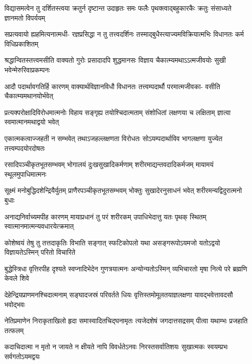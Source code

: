 \fourlineindentedshloka
{विद्यासमत्वेन तु दर्शितस्त्वया}
{क्रतुर्न दृष्टान्त उदाहृतः समः}
{फलैः पृथक्त्वाद्बहुकारकैः क्रतुः}
{संसाध्यते ज्ञानमतो विपर्ययम्} %

\fourlineindentedshloka
{सप्रत्यवायो ह्यहमित्यनात्मधी-}
{रज्ञप्रसिद्धा न तु तत्त्वदर्शिनः}
{तस्माद्बुधैस्त्याज्यमविक्रियात्मभिः}
{विधानतः कर्म विधिप्रकाशितम्} %

\fourlineindentedshloka
{श्रद्धान्वितस्तत्त्वमसीति वाक्यतो}
{गुरोः प्रसादादपि शुद्धमानसः}
{विज्ञाय चैकात्म्यमथाऽऽत्मजीवयोः}
{सुखी भवेन्मेरुरिवाप्रकम्पनः} %

\fourlineindentedshloka
{आदौ पदार्थावगतिर्हि कारणम्}
{वाक्यार्थविज्ञानविधौ विधानतः}
{तत्त्वम्पदार्थौ परमात्मजीवका-}
{वसीति चैकात्म्यमथानयोर्भवेत्} %

\fourlineindentedshloka
{प्रत्यक्परोक्षादिविरोधमात्मनोः}
{विहाय सङ्गृह्य तयोश्चिदात्मताम्}
{संशोधितां लक्षणया च लक्षिताम्}
{ज्ञात्वा स्वमात्मानमथाद्वयो भवेत्} %

\fourlineindentedshloka
{एकात्मकत्वाज्जहती न सम्भवेत्}
{तथाऽजहल्लक्षणता विरोधतः}
{सोऽयम्पदार्थाविव भागलक्षणा}
{युज्येत तत्त्वम्पदयोरदोषतः} %

\fourlineindentedshloka
{रसादिपञ्चीकृतभूतसम्भवम्}
{भोगालयं दुःखसुखादिकर्मणाम्}
{शरीरमाद्यन्तवदादिकर्मजम्}
{मायामयं स्थूलमुपाधिमात्मनः} %

\fourlineindentedshloka
{सूक्ष्मं मनोबुद्धिदशेन्द्रियैर्युतम्}
{प्राणैरपञ्चीकृतभूतसम्भवम्}
{भोक्तुः सुखादेरनुसाधनं भवेत्}
{शरीरमन्यद्विदुरात्मनो बुधाः} %

\fourlineindentedshloka
{अनाद्यनिर्वाच्यमपीह कारणम्}
{मायाप्रधानं तु परं शरीरकम्}
{उपाधिभेदात्तु यतः पृथक् स्थितम्}
{स्वात्मानमात्मन्यवधारयेत्क्रमात्} %

\fourlineindentedshloka
{कोशेष्वयं तेषु तु तत्तदाकृतिः}
{विभाति सङ्गात् स्फटिकोपलो यथा}
{असङ्गरूपोऽयमजो यतोऽद्वयो}
{विज्ञायतेऽस्मिन् परितो विचारिते} %

\fourlineindentedshloka
{बुद्धेस्त्रिधा वृत्तिरपीह दृश्यते}
{स्वप्नादिभेदेन गुणत्रयात्मनः}
{अन्योन्यतोऽस्मिन् व्यभिचारतो मृषा}
{नित्ये परे ब्रह्मणि केवले शिवे} %

\fourlineindentedshloka
{देहेन्द्रियप्राणमनश्चिदात्मनाम्}
{सङ्घादजस्रं परिवर्तते धियः}
{वृत्तिस्तमोमूलतयाज्ञलक्षणा}
{यावद्भवेत्तावदसौ भवोद्भवः} %

\fourlineindentedshloka
{नेतिप्रमाणेन निराकृताखिलो}
{हृदा समास्वादितचिद्घनामृतः}
{त्यजेदशेषं जगदात्तसद्रसम्}
{पीत्वा यथाम्भः प्रजहाति तत्फलम्} %

\fourlineindentedshloka
{कदाचिदात्मा न मृतो न जायते}
{न क्षीयते नापि विवर्धतेऽनवः}
{निरस्तसर्वातिशयः सुखात्मकः}
{स्वयम्प्रभः सर्वगतोऽयमद्वयः} %

